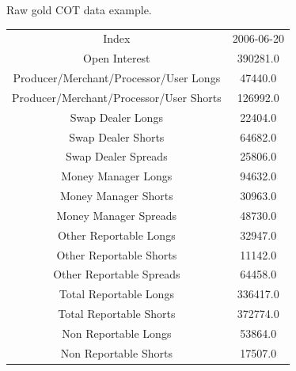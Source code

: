 \documentclass[final,2p]{elsarticle}
\begin{document}
Raw gold COT data example.
\nopagebreak[0]
\begin{center}
    \begin{tabular}{c|c}
 	 Index & 2006-06-20\\
     Open Interest & 390281.0\\
     Producer/Merchant/Processor/User Longs & 47440.0 \\
     Producer/Merchant/Processor/User Shorts & 126992.0 \\
     Swap Dealer Longs & 22404.0 \\
     Swap Dealer Shorts & 64682.0 \\
     Swap Dealer Spreads & 25806.0 \\
     Money Manager Longs & 94632.0 \\
     Money Manager Shorts & 30963.0 \\
     Money Manager Spreads & 48730.0 \\
     Other Reportable Longs & 32947.0  \\
     Other Reportable Shorts & 11142.0 \\
     Other Reportable Spreads & 64458.0 \\
     Total Reportable Longs & 336417.0 \\
     Total Reportable Shorts & 372774.0 \\
     Non Reportable Longs & 53864.0 \\
     Non Reportable Shorts & 17507.0\\
    \end{tabular}
\end{center}
\end{document}
